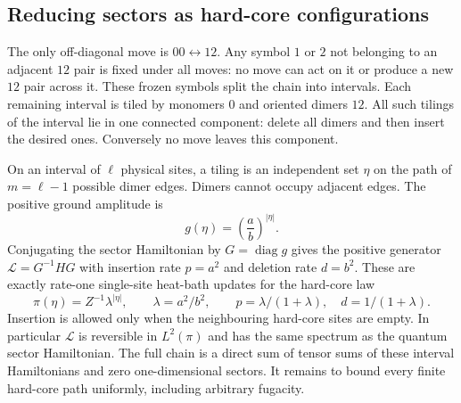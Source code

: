 \documentclass[11pt,a4paper]{article}
\theoremstyle{remark}\newtheorem{remark}[theorem]{Remark}
\newcommand{\diag}{\operatorname{diag}}
\begin{document}
\subsection{Reducing sectors as hard-core configurations}
The only off-diagonal move is $00\leftrightarrow12$. Any symbol $1$ or $2$ not belonging to an adjacent $12$ pair is fixed under all moves: no move can act on it or produce a new $12$ pair across it. These frozen symbols split the chain into intervals. Each remaining interval is tiled by monomers $0$ and oriented dimers $12$. All such tilings of the interval lie in one connected component: delete all dimers and then insert the desired ones. Conversely no move leaves this component.

On an interval of $\ell$ physical sites, a tiling is an independent set $\eta$ on the path of $m=\ell-1$ possible dimer edges. Dimers cannot occupy adjacent edges. The positive ground amplitude is
\[
 g(\eta)=\left(\frac ab\right)^{|\eta|}.
\]
Conjugating the sector Hamiltonian by $G=\diag g$ gives the positive generator $\mathcal L=G^{-1}H G$ with insertion rate $p=a^2$ and deletion rate $d=b^2$. These are exactly rate-one single-site heat-bath updates for the hard-core law
\[
 \pi(\eta)=Z^{-1}\lambda^{|\eta|},\qquad \lambda=a^2/b^2,
 \qquad p=\lambda/(1+\lambda),\quad d=1/(1+\lambda).
\]
Insertion is allowed only when the neighbouring hard-core sites are empty. In particular $\mathcal L$ is reversible in $L^2(\pi)$ and has the same spectrum as the quantum sector Hamiltonian. The full chain is a direct sum of tensor sums of these interval Hamiltonians and zero one-dimensional sectors. It remains to bound every finite hard-core path uniformly, including arbitrary fugacity.
\end{document}
